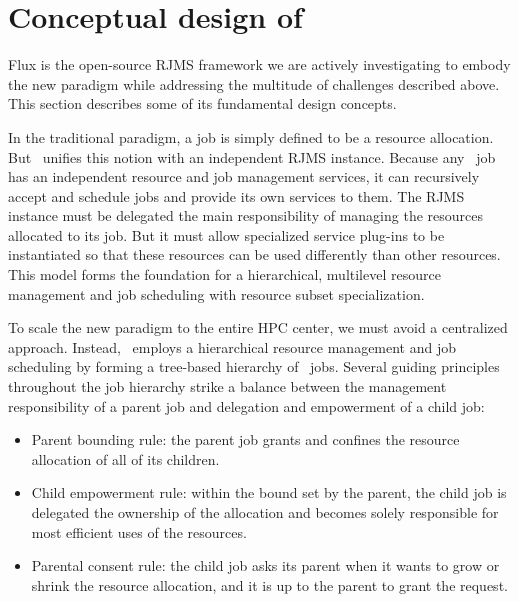 \section{Conceptual design of \flux}
\label{models}
Flux is the open-source RJMS framework we are actively
investigating to embody the new paradigm while
addressing the multitude of challenges described above.
This section describes some of its fundamental design
concepts.

\vspace{1ex}
 In the traditional paradigm, 
a job is simply defined to be a resource allocation. 
But \flux\ unifies this notion with an independent 
RJMS instance. Because any \flux\ job has 
an independent resource and job management services,
it can recursively accept and schedule jobs and provide its own 
services to them. 
The RJMS instance must be delegated
the main responsibility of managing the resources allocated
to its job. But it must allow specialized service
plug-ins to be instantiated so that these resources
can be used differently than other resources.  
This model forms 
the foundation for a hierarchical,
multilevel resource management and job scheduling
with resource subset specialization.

\vspace{1ex}
 To scale the new paradigm 
to the entire HPC center, we must avoid a centralized approach. 
Instead, \flux\ employs a hierarchical resource management 
and job scheduling by forming a tree-based hierarchy of \flux\ jobs. 
Several guiding principles throughout the job hierarchy strike 
a balance between the management responsibility 
of a parent job and delegation and empowerment of a child job:

\begin{itemize}
\item{Parent bounding rule: the parent job grants 
and confines the resource allocation of all of its children.}

\item{Child empowerment rule: within the bound set 
by the parent, the child job is delegated the ownership 
of the allocation and becomes solely responsible 
for most efficient uses of the resources.}

\item{Parental consent rule: the child job asks 
its parent when it wants to grow or shrink the resource 
allocation, and it is up to the parent to grant the request.}
\end{itemize}

